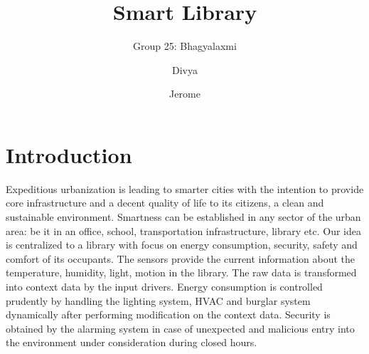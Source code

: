 \documentclass[runningheads]{llncs}
\begin{document}
%

\title{Smart Library}

\author{Group 25: Bhagyalaxmi \and
Divya \and
Jerome}

%
\maketitle              %
%
%
%
%
\section{Introduction}
Expeditious urbanization is leading to smarter cities with the intention to provide core infrastructure and a decent quality of life to its citizens, a clean and sustainable environment. Smartness can be established in any sector of the urban area: be it in an office, school, transportation infrastructure, library etc. 
Our idea is centralized to a library with focus on energy consumption, security, safety and comfort of its occupants. The sensors provide the current information about the temperature, humidity, light, motion in the library. The raw data  is transformed into context data by the input drivers. Energy consumption is controlled prudently by handling the lighting system, HVAC and burglar system dynamically after performing modification on the context data. Security is obtained by the alarming system in case of unexpected and malicious entry into the environment under consideration during closed hours.
\end{document}
